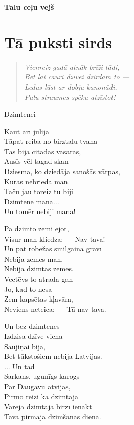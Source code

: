 \documentclass[14pt]{extarticle}
\begin{document}
\begin{center}
{\LARGE \bf Tālu ceļu vējš}
\end{center}

{\normalsize

\section{Tā puksti sirds}

\begin{quote}
{\em
Vienreiz gadā atnāk brīži tādi,\\
Bet lai cauri dzīvei dzirdam to ---\\
Ledus lūst ar dobju kanonādi,\\
Palu straumes spēku atzīstot!
}
\end{quote}

{\large \sc Dzimtenei}

Kaut arī jūlijā\\
Tāpat reiba no birztalu tvana ---\\
Tās bija citādas vasaras,\\
Ausīs vēl tagad skan\\
Dziesma, ko dziedāja sanošās vārpas,\\
Kuras nebrieda man.\\
Taču jau toreiz tu biji\\
Dzimtene mana...\\
Un tomēr nebiji mana!

Pa dzimto zemi ejot,\\
Visur man kliedza: --- Nav tava! ---\\
Un pat robežas smilgainā grāvī\\
Nebija zemes man.\\
Nebija dzimtās zemes.\\
Vectēvs to atrada gan ---\\
Jo, kad to nesa\\
Zem kapsētas kļavām,\\
Neviens neteica: --- Tā nav tava. ---

Un bez dzimtenes\\
Izdzisa dzīve viena ---\\
Saujiņai bija,\\
Bet tūkstošiem nebija Latvijas.\\
... Un tad\\
Sarkans, ugunīgs karogs\\
Pār Daugavu atvijās,\\
Pirmo reizi kā dzimtajā\\
Varēja dzimtajā birzī ienākt\\
Tavā pirmajā dzimšanas dienā.

}
\end{document}
